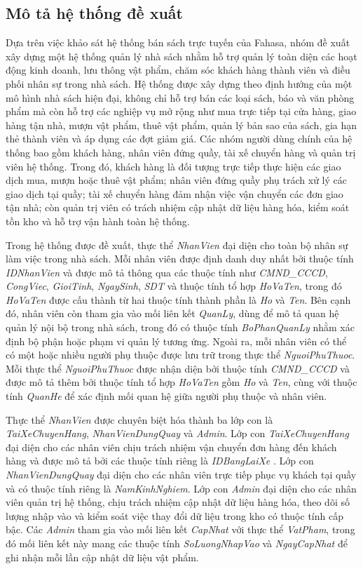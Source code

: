 \subsection{Mô tả hệ thống đề xuất}

Dựa trên việc khảo sát hệ thống bán sách trực tuyến của Fahasa, nhóm đề xuất xây dựng một hệ thống quản lý nhà sách nhằm hỗ trợ quản lý toàn diện các hoạt động kinh doanh, lưu thông vật phẩm, chăm sóc khách hàng thành viên và điều phối nhân sự trong nhà sách. Hệ thống được xây dựng theo định hướng của một mô hình nhà sách hiện đại, không chỉ hỗ trợ bán các loại sách, báo và văn phòng phẩm mà còn hỗ trợ các nghiệp vụ mở rộng như mua trực tiếp tại cửa hàng, giao hàng tận nhà, mượn vật phẩm, thuê vật phẩm, quản lý bản sao của sách, gia hạn thẻ thành viên và áp dụng các đợt giảm giá. Các nhóm người dùng chính của hệ thống bao gồm khách hàng, nhân viên đứng quầy, tài xế chuyển hàng và quản trị viên hệ thống. Trong đó, khách hàng là đối tượng trực tiếp thực hiện các giao dịch mua, mượn hoặc thuê vật phẩm; nhân viên đứng quầy phụ trách xử lý các giao dịch tại quầy; tài xế chuyển hàng đảm nhận việc vận chuyển các đơn giao tận nhà; còn quản trị viên có trách nhiệm cập nhật dữ liệu hàng hóa, kiểm soát tồn kho và hỗ trợ vận hành toàn hệ thống.

Trong hệ thống được đề xuất, thực thể \textit{NhanVien} đại diện cho toàn bộ nhân sự làm việc trong nhà sách. Mỗi nhân viên được định danh duy nhất bởi thuộc tính \textit{IDNhanVien} và được mô tả thông qua các thuộc tính như \textit{CMND\_CCCD}, \textit{CongViec}, \textit{GioiTinh}, \textit{NgaySinh}, \textit{SDT} và thuộc tính tổ hợp \textit{HoVaTen}, trong đó \textit{HoVaTen} được cấu thành từ hai thuộc tính thành phần là \textit{Ho} và \textit{Ten}. Bên cạnh đó, nhân viên còn tham gia vào mối liên kết \textit{QuanLy}, dùng để mô tả quan hệ quản lý nội bộ trong nhà sách, trong đó có thuộc tính \textit{BoPhanQuanLy} nhằm xác định bộ phận hoặc phạm vi quản lý tương ứng. Ngoài ra, mỗi nhân viên có thể có một hoặc nhiều người phụ thuộc được lưu trữ trong thực thể \textit{NguoiPhuThuoc}. Mỗi thực thể \textit{NguoiPhuThuoc} được nhận diện bởi thuộc tính \textit{CMND\_CCCD} và được mô tả thêm bởi thuộc tính tổ hợp \textit{HoVaTen} gồm \textit{Ho} và \textit{Ten}, cùng với thuộc tính \textit{QuanHe} để xác định mối quan hệ giữa người phụ thuộc và nhân viên.

Thực thể \textit{NhanVien} được chuyên biệt hóa thành ba lớp con là \textit{TaiXeChuyenHang}, \textit{NhanVienDungQuay} và \textit{Admin}. Lớp con \textit{TaiXeChuyenHang} đại diện cho các nhân viên chịu trách nhiệm vận chuyển đơn hàng đến khách hàng và được mô tả bởi các thuộc tính riêng là \textit{IDBangLaiXe} . Lớp con \textit{NhanVienDungQuay} đại diện cho các nhân viên trực tiếp phục vụ khách tại quầy và có thuộc tính riêng là \textit{NamKinhNghiem}. Lớp con \textit{Admin} đại diện cho các nhân viên quản trị hệ thống, chịu trách nhiệm cập nhật dữ liệu hàng hóa, theo dõi số lượng nhập vào và kiểm soát việc thay đổi dữ liệu trong kho có thuộc tính cấp bậc. Các \textit{Admin} tham gia vào mối liên kết \textit{CapNhat} với thực thể \textit{VatPham}, trong đó mối liên kết này mang các thuộc tính \textit{SoLuongNhapVao} và \textit{NgayCapNhat} để ghi nhận mỗi lần cập nhật dữ liệu vật phẩm.

